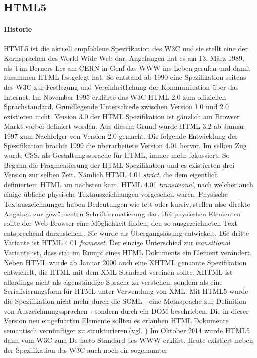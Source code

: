 \documentclass[12pt,a4paper,bibliography=totocnumbered,listof=totocnumbered]{scrartcl}
\begin{document}
\subsection{HTML5}
\paragraph{Historie} \ac{HTML}5 ist die aktuell empfohlene Spezifikation des \ac{W3C} und sie stellt eine der Kernsprachen des World Wide Web dar. Angefangen hat es am 13. März 1989, als Tim Berners-Lee am CERN in Genf das \ac{WWW} ins Leben gerufen und damit zusammen \ac{HTML} festgelegt hat. So entstand ab 1990 eine Spezifikation seitens des \ac{W3C} zur Festlegung und Vereinheitlichung der Kommunikation über das Internet. Im November 1995 erklärte das \ac{W3C} \ac{HTML} 2.0 zum offiziellen Sprachstandard. Grundlegende Unterschiede zwischen Version 1.0 und 2.0 existieren nicht. Version 3.0 der \ac{HTML} Spezifikation ist gänzlich am Browser Markt vorbei definiert worden. Aus diesem Grund wurde \ac{HTML} 3.2 ab Januar 1997 zum Nachfolger von Version 2.0 gemacht. Die folgende Entwicklung der Spezifikation brachte 1999 die überarbeitete Version 4.01 hervor. Im selben Zug wurde \ac{CSS}, als Gestaltungssprache für \ac{HTML}, immer mehr fokussiert. So Begann die Fragmentierung der \ac{HTML} Spezifikation und es existierten drei Version zur selben Zeit. Nämlich \ac{HTML} 4.01 \textit{strict}, die dem eigentlich definiertem HTML am nächsten kam. \ac{HTML} 4.01 \textit{transitional}, nach welcher auch einige übliche physische Textauszeichnungen vorgesehen waren. \glqq Physische Textauszeichnungen haben Bedeutungen wie \glqq fett\grqq{} oder \glqq kursiv\grqq{}, stellen also direkte Angaben zur gewünschten Schriftformatierung dar. Bei physischen Elementen sollte der Web-Browser eine Möglichkeit finden, den so ausgezeichneten Text entsprechend darzustellen.\grqq{}\cite{SelfHTML20141}. Sie wurde als Übergangslösung entwickelt. Die dritte Variante ist \ac{HTML} 4.01 \textit{frameset}. Der einzige Unterschied zur \textit{transitional} Variante ist, dass sich im Rumpf eines HTML Dokuments ein Element verändert. Neben \ac{HTML} wurde ab Januar 2000 auch eine \ac{XHTML} genannte Spezifikation entwickelt, die \ac{HTML} mit dem \ac{XML} Standard vereinen sollte. \ac{XHTML} ist allerdings nicht als eigenständige Sprache zu verstehen, sondern als eine Serialisierungsform für \ac{HTML} unter Verwendung von \ac{XML}. Mit \ac{HTML}5 wurde die Spezifikation nicht mehr durch die \ac{SGML} - eine Metasprache zur Definition von Auszeichnungssprachen - sondern durch ein \ac{DOM} beschrieben. Die in dieser Version neu eingeführten Elemente sollten es erlauben \ac{HTML} Dokumente semantisch vernünftiger zu strukturieren.(vgl. \cite[S.20ff]{MunzHTML2012}) Im Oktober 2014 wurde \ac{HTML}5 dann vom \ac{W3C} zum De-facto Standard des \ac{WWW} erklärt. Heute existiert neben der Spezifikation des \ac{W3C} auch noch ein sogenannter \glqq 
\end{document}
